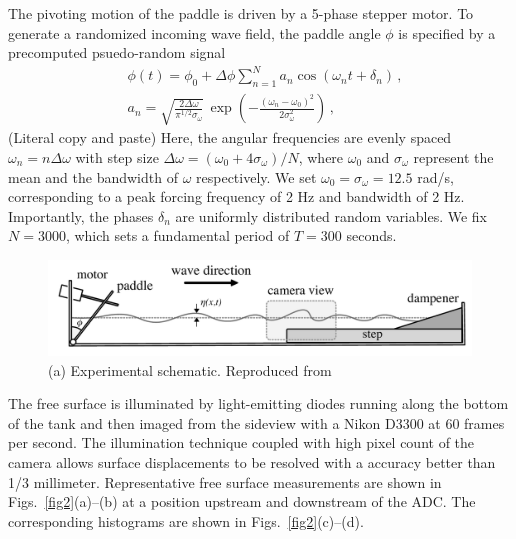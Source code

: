\documentclass[11pt]{article}
\newcommand{\omavg}{\omega_0}
\newcommand{\omsig}{\sigma_{\omega}}
\begin{document}
The pivoting motion of the paddle is driven by a 5-phase stepper motor. To generate a randomized incoming wave field, the paddle angle $\phi$ is specified by a precomputed psuedo-random signal
\begin{align}
\label{PaddleAngle}
& \phi(t) = \phi_0 + \Delta \phi \sum_{n=1}^N a_n \cos(\omega_n t+\delta_n) \, , \\
\label{anEq}
& a_n = \sqrt{\frac{2 \Delta \omega}{\pi^{1/2} \omsig}} \, 
\exp \left( -\frac{(\omega_n - \omavg)^2}{2 \omsig^2} \right) \, ,
\end{align}
(Literal copy and paste) Here, the angular frequencies are evenly spaced $\omega_n = n  \Delta \omega$ with step size $ \Delta \omega = (\omavg+4 \omsig)/N$, where $\omavg$ and $\omsig$ represent the mean and the bandwidth of $\omega$ respectively. We set $\omavg = \omsig = 12.5$ rad/s, corresponding to a peak forcing frequency of 2 Hz and bandwidth of 2 Hz. Importantly, the phases $\delta_n$ are uniformly distributed random variables. We fix $N = 3000$, which sets a fundamental period of $T = 300$ seconds.
	
\begin{figure}%
\begin{center}
\includegraphics[width = 0.85 \linewidth]{Figs/fig1.pdf}
\caption{
(a) Experimental schematic. Reproduced from \cite{bolles2019anomalous}
}
\label{fig1}
\end{center}
\end{figure}

	The free surface is illuminated by light-emitting diodes running along the bottom of the tank and then imaged from the sideview with a Nikon D3300 at 60 frames per second. The illumination technique coupled with high pixel count of the camera allows surface displacements to be resolved with a accuracy better than 1/3 millimeter. Representative free surface measurements are shown in Figs.~\ref{fig2}(a)--(b) at a position upstream and downstream of the ADC. The corresponding histograms are shown in Figs.~\ref{fig2}(c)--(d).
\end{document}
